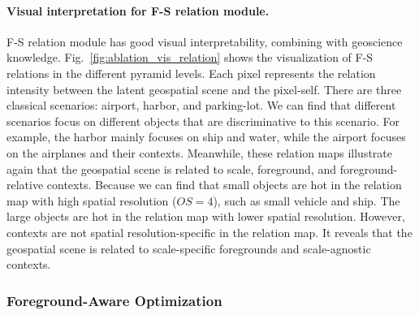 \documentclass[10pt,twocolumn,letterpaper]{article}
\begin{document}
\begin{figure*}
   \caption{Visualization of F-S relation heatmap in the different pyramid levels. (a) original images. (b) object segmentation results. (c)-(f) images with F-S relation heatmaps in the different pyramid level. $OS$ denotes ``output stride'' defined in FPN. For convenient visualization, we resize these relation maps to corresponding image sizes.
   Legend: Scene 1 (\textcolor[rgb]{0,0.5,1}{plane}, \textcolor[rgb]{0,0.5,0.5}{large vehicle}, \textcolor[rgb]{0,0,0.5}{small vehicle}), 
   Scene 2 (\textcolor[rgb]{0,0,0.5}{small vehicle}, \textcolor[rgb]{0,0.39,0.608}{harbor}, \textcolor[rgb]{0,0,0.25}{ship}),
   Scene 3 (\textcolor[rgb]{0,0,0.5}{small vehicle}, 
   \textcolor[rgb]{0, 0.25, 0.5}{tennis court}, \textcolor[rgb]{0, 0.25, 0}{baseball diamond}), in a row order.}
   \label{fig:ablation_vis_relation}
\end{figure*}

\paragraph{Visual interpretation for F-S relation module.}
F-S relation module has good visual interpretability, combining with geoscience knowledge.
Fig.~\ref{fig:ablation_vis_relation} shows the visualization of F-S relations in the different pyramid levels.
Each pixel represents the relation intensity between the latent geospatial scene and the pixel-self.
There are three classical scenarios: airport, harbor, and parking-lot.
We can find that different scenarios focus on different objects that are discriminative to this scenario.
For example, the harbor mainly focuses on ship and water, while the airport focuses on the airplanes and their contexts.
Meanwhile, these relation maps illustrate again that the geospatial scene is related to scale, foreground, and foreground-relative contexts.
Because we can find that small objects are hot in the relation map with high spatial resolution ($OS =4$), such as small vehicle and ship.
The large objects are hot in the relation map with lower spatial resolution.
However, contexts are not spatial resolution-specific in the relation map.
It reveals that the geospatial scene is related to scale-specific foregrounds and scale-agnostic contexts.



\subsubsection{Foreground-Aware Optimization}
\end{document}

